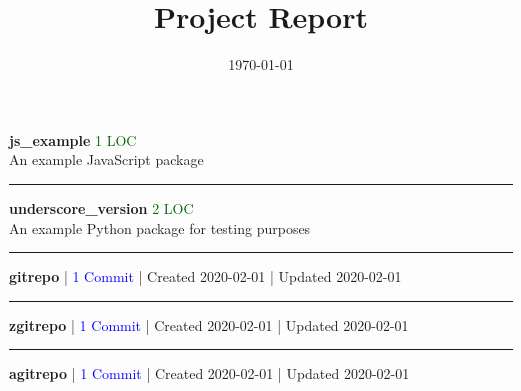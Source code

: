 \documentclass[]{article}
\begin{document}
\title{Project Report}
\author{}
\date{\today}
\maketitle
\textbf{js\_example}
\textcolor{darkgreen}{1 LOC}
\\
An example JavaScript package
\\
\noindent\rule{\textwidth}{0.4pt}


\vspace{0.5cm}
\textbf{underscore\_version}
\textcolor{darkgreen}{2 LOC}
\\
An example Python package for testing purposes
\\
\noindent\rule{\textwidth}{0.4pt}


\vspace{0.5cm}
\textbf{gitrepo}
|
\textcolor{blue}{1 Commit}
|
Created 2020-02-01
|
Updated 2020-02-01
\\
\noindent\rule{\textwidth}{0.4pt}


\vspace{0.5cm}
\textbf{zgitrepo}
|
\textcolor{blue}{1 Commit}
|
Created 2020-02-01
|
Updated 2020-02-01
\\
\noindent\rule{\textwidth}{0.4pt}


\vspace{0.5cm}
\textbf{agitrepo}
|
\textcolor{blue}{1 Commit}
|
Created 2020-02-01
|
Updated 2020-02-01
\\
\end{document}
